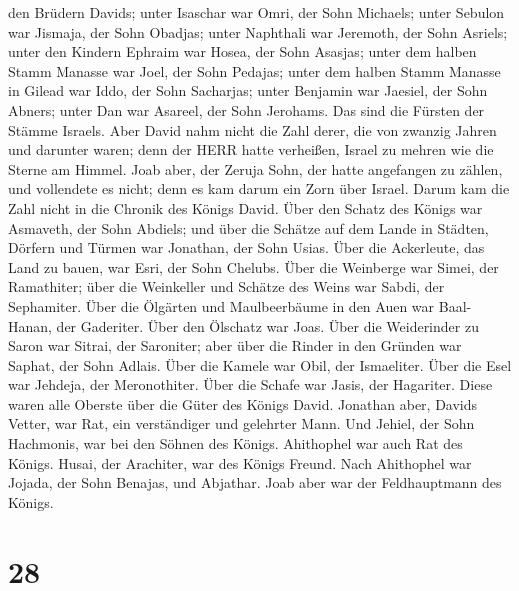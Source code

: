 den Brüdern Davids; unter Isaschar war Omri, der Sohn Michaels;
 unter Sebulon war Jismaja, der Sohn Obadjas; unter
Naphthali war Jeremoth, der Sohn Asriels;  unter den
Kindern Ephraim war Hosea, der Sohn Asasjas; unter dem halben Stamm
Manasse war Joel, der Sohn Pedajas;  unter dem halben Stamm
Manasse in Gilead war Iddo, der Sohn Sacharjas; unter Benjamin war
Jaesiel, der Sohn Abners;  unter Dan war Asareel, der Sohn
Jerohams. Das sind die Fürsten der Stämme Israels.  Aber
David nahm nicht die Zahl derer, die von zwanzig Jahren und darunter
waren; denn der HERR hatte verheißen, Israel zu mehren wie die Sterne am
Himmel.  Joab aber, der Zeruja Sohn, der hatte angefangen
zu zählen, und vollendete es nicht; denn es kam darum ein Zorn über
Israel. Darum kam die Zahl nicht in die Chronik des Königs David.
 Über den Schatz des Königs war Asmaveth, der Sohn Abdiels;
und über die Schätze auf dem Lande in Städten, Dörfern und Türmen war
Jonathan, der Sohn Usias.  Über die Ackerleute, das Land zu
bauen, war Esri, der Sohn Chelubs.  Über die Weinberge war
Simei, der Ramathiter; über die Weinkeller und Schätze des Weins war
Sabdi, der Sephamiter.  Über die Ölgärten und Maulbeerbäume
in den Auen war Baal-Hanan, der Gaderiter. Über den Ölschatz war Joas.
 Über die Weiderinder zu Saron war Sitrai, der Saroniter;
aber über die Rinder in den Gründen war Saphat, der Sohn Adlais.
 Über die Kamele war Obil, der Ismaeliter. Über die Esel
war Jehdeja, der Meronothiter.  Über die Schafe war Jasis,
der Hagariter. Diese waren alle Oberste über die Güter des Königs David.
 Jonathan aber, Davids Vetter, war Rat, ein verständiger
und gelehrter Mann. Und Jehiel, der Sohn Hachmonis, war bei den Söhnen
des Königs.  Ahithophel war auch Rat des Königs. Husai, der
Arachiter, war des Königs Freund.  Nach Ahithophel war
Jojada, der Sohn Benajas, und Abjathar. Joab aber war der Feldhauptmann
des Königs.

\hypertarget{section-27}{%
\section{28}\label{section-27}}

